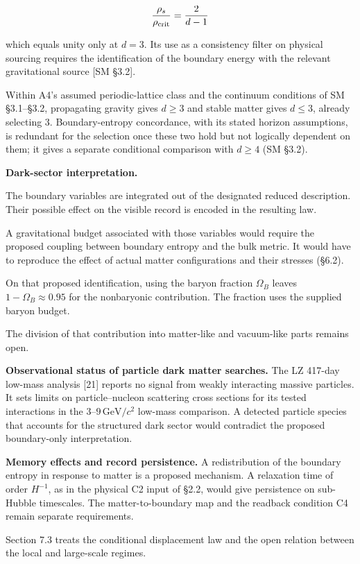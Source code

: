 \documentclass[
]{article}
\begin{document}
\[\frac{\rho_s}{\rho_{\rm crit}} = \frac{2}{d-1}\]

which equals unity only at \(d=3\). Its use as a consistency filter on
physical sourcing requires the identification of the boundary energy
with the relevant gravitational source {[}SM §3.2{]}.

Within A4's assumed periodic-lattice class and the continuum conditions
of SM §3.1--§3.2, propagating gravity gives \(d\geq3\) and stable matter
gives \(d\leq3\), already selecting \(3\). Boundary-entropy concordance,
with its stated horizon assumptions, is redundant for the selection once
these two hold but not logically dependent on them; it gives a separate
conditional comparison with \(d\geq4\) (SM §3.2).

\textbf{Dark-sector interpretation.}

The boundary variables are integrated out of the designated reduced
description. Their possible effect on the visible record is encoded in
the resulting law.

A gravitational budget associated with those variables would require the
proposed coupling between boundary entropy and the bulk metric. It would
have to reproduce the effect of actual matter configurations and their
stresses (§6.2).

On that proposed identification, using the baryon fraction \(\Omega_B\)
leaves \(1-\Omega_B\approx0.95\) for the nonbaryonic contribution. The
fraction uses the supplied baryon budget.

The division of that contribution into matter-like and vacuum-like parts
remains open.

\textbf{Observational status of particle dark matter searches.} The LZ
417-day low-mass analysis {[}21{]} reports no signal from weakly
interacting massive particles. It sets limits on particle--nucleon
scattering cross sections for its tested interactions in the
\(3\)--\(9\,\mathrm{GeV}/c^2\) low-mass comparison. A detected particle
species that accounts for the structured dark sector would contradict
the proposed boundary-only interpretation.

\textbf{Memory effects and record persistence.} A redistribution of the
boundary entropy in response to matter is a proposed mechanism. A
relaxation time of order \(H^{-1}\), as in the physical C2 input of
§2.2, would give persistence on sub-Hubble timescales. The
matter-to-boundary map and the readback condition C4 remain separate
requirements.

Section 7.3 treats the conditional displacement law and the open
relation between the local and large-scale regimes.
\end{document}
